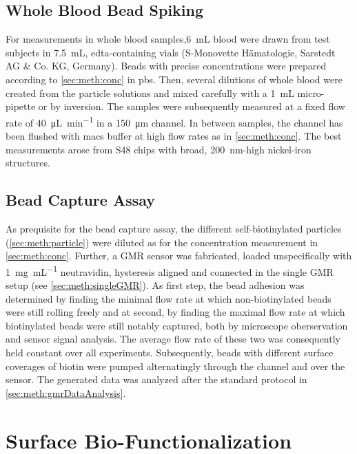 \subsection{Whole Blood Bead Spiking}
For measurements in whole blood samples,\SI{6}{\milli\liter} blood were drawn from test subjects in \SI{7.5}{\milli\liter}, \gls{edta}-containing vials (S-Monovette Hämatologie, Sarstedt AG \& Co. KG, Germany). Beads with precise concentrations were prepared according to \cref{sec:meth:conc} in \gls{pbs}. Then, several dilutions of whole blood were created from the particle solutions and mixed carefully with a \SI{1}{\milli\liter} micro-pipette or by inversion. The samples were subsequently measured at a fixed flow rate of \SI{40}{\micro\liter\per\minute} in a \SI{150}{\micro\meter} channel. In between samples, the channel has been flushed with \gls{macs} buffer at high flow rates as in \cref{sec:meth:conc}. The best measurements arose from S48 chips with broad, \SI{200}{\nano\meter}-high nickel-iron structures.
\subsection{Bead Capture Assay}
As prequisite for the bead capture assay, the different self-biotinylated particles (\cref{sec:meth:particle}) were diluted as for the concentration measurement in \cref{sec:meth:conc}.  Further, a GMR sensor was fabricated, loaded unspecifically with \SI{1}{\milli\gram\per\milli\liter} neutravidin, hysteresis aligned and connected in the single GMR setup (see \ref{sec:meth:singleGMR}). As first step, the bead adhesion was determined by finding the minimal flow rate at which non-biotinylated beads were still rolling freely and at second, by finding the maximal flow rate at which biotinylated beads were still notably captured, both by microscope oberservation and sensor signal analysis. The average flow rate of these two was consequently held constant over all experiments. Subsequently, beads with different surface coverages of biotin were pumped alternatingly through the channel and over the sensor. The generated data was analyzed after the standard protocol in \ref{sec:meth:gmrDataAnalysis}.
\section{Surface Bio-Functionalization}
